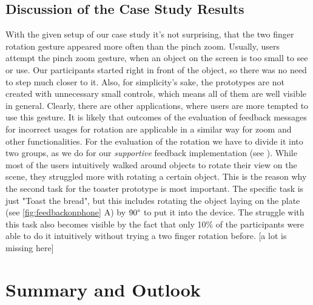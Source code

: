 \documentclass[11pt, a4paper]{article}
\begin{document}
		\subsection*{Discussion of the Case Study Results}\label{ssec:discussion}
			With the given setup of our case study it's not surprising, that the two finger rotation gesture appeared more often than the pinch zoom. Usually, users attempt the pinch zoom gesture, when an object on the screen is too small to see or use. Our participants started right in front of the object, so there was no need to step much closer to it. Also, for simplicity's sake, the prototypes are not created with unnecessary small controls, which means all of them are well visible in general. Clearly, there are other applications, where users are more tempted to use this gesture. It is likely that outcomes of the evaluation of feedback messages for incorrect usages for rotation are applicable in a similar way for zoom and other functionalities. For the evaluation of the rotation we have to divide it into two groups, as we do for our \emph{supportive} feedback implementation (see ). While most of the users intuitively walked around objects to rotate their view on the scene, they struggled more with rotating a certain object. This is the reason why the second task for the toaster prototype is most important. The specific task is just "Toast the bread", but this includes rotating the object laying on the plate (see \ref{fig:feedbackonphone} A) by $90\degree$ to put it into the device. The struggle with this task also becomes visible by the fact that only 10\% of the participants were able to do it intuitively without trying a two finger rotation before.
			[a lot is missing here]

	\section*{Summary and Outlook}\label{sec:summary}
		\lipsum[2-3]

	\pagebreak
	\printbibliography
\restoregeometry
\end{document}
